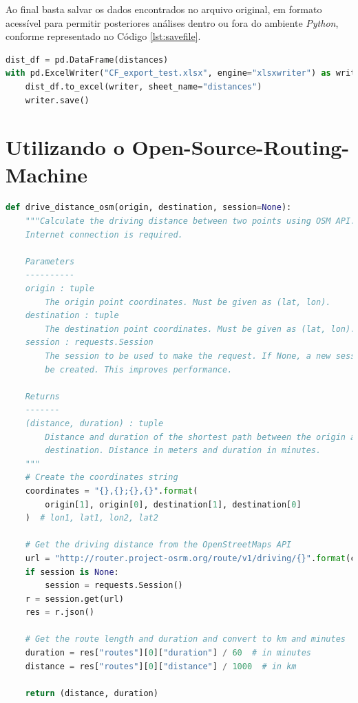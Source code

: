 Ao final basta salvar os dados encontrados no arquivo original, em formato acessível para permitir posteriores análises dentro ou fora do ambiente \textit{Python}, conforme representado no Código \ref{lst:savefile}. 

\begin{lstlisting}[language=Python, label={lst:savefile}, caption= \small Salvando o arquivo em formato .xlsx \normalsize]
dist_df = pd.DataFrame(distances)
with pd.ExcelWriter("CF_export_test.xlsx", engine="xlsxwriter") as writer:
    dist_df.to_excel(writer, sheet_name="distances")
    writer.save()

\end{lstlisting}

\section{Utilizando o Open-Source-Routing-Machine}

\begin{lstlisting}[language=Python, label={lst:drive_distance_osm},caption= \small Open-Source-Routing-Machine \normalsize]
def drive_distance_osm(origin, destination, session=None):
    """Calculate the driving distance between two points using OSM API.
    Internet connection is required.

    Parameters
    ----------
    origin : tuple
        The origin point coordinates. Must be given as (lat, lon).
    destination : tuple
        The destination point coordinates. Must be given as (lat, lon).
    session : requests.Session
        The session to be used to make the request. If None, a new session will
        be created. This improves performance.

    Returns
    -------
    (distance, duration) : tuple
        Distance and duration of the shortest path between the origin and 
        destination. Distance in meters and duration in minutes.
    """
    # Create the coordinates string
    coordinates = "{},{};{},{}".format(
        origin[1], origin[0], destination[1], destination[0]
    )  # lon1, lat1, lon2, lat2

    # Get the driving distance from the OpenStreetMaps API
    url = "http://router.project-osrm.org/route/v1/driving/{}".format(coordinates)
    if session is None:
        session = requests.Session()
    r = session.get(url)
    res = r.json()

    # Get the route length and duration and convert to km and minutes
    duration = res["routes"][0]["duration"] / 60  # in minutes
    distance = res["routes"][0]["distance"] / 1000  # in km

    return (distance, duration)
\end{lstlisting}

